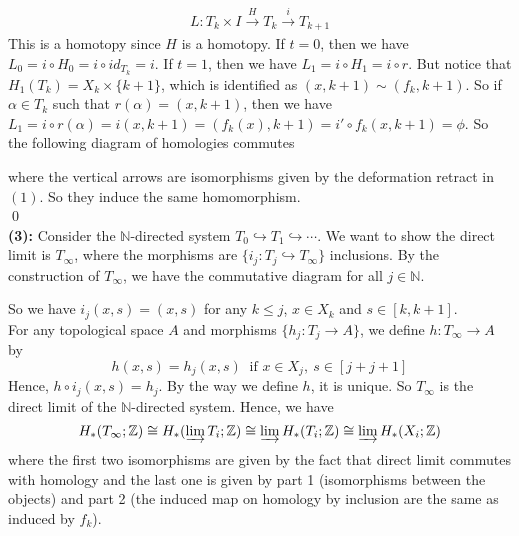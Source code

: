 \documentclass[12pt]{amsart}
\newcommand{\Z}{\mathbb{Z}}
\newcommand{\N}{\mathbb{N}}
\begin{document}
\[L:T_k\times I\xrightarrow[]{H}T_k\xrightarrow[]{i} T_{k+1}\]
This is a homotopy since $H$ is a homotopy. If $t=0$, then we have $L_0=i\circ H_0=i\circ id_{T_k}=i$. If $t=1$, then we have $L_1=i\circ H_1=i\circ r$. But notice that $H_1(T_k)=X_k\times \{k+1\}$, which is identified as $(x,k+1)\sim(f_k,k+1)$. So if $\alpha\in T_k$ such that $r(\alpha)=(x,k+1)$, then we have 
$L_1=i\circ r(\alpha)=i(x,k+1)=(f_k(x),k+1)=i'\circ f_k(x,k+1)=\phi$. So the following diagram of homologies commutes
\begin{center}
\end{center}
where the vertical arrows are isomorphisms given by the deformation retract in $(1)$. So they induce the same homomorphism.
\\\qed\\
\textbf{(3):} Consider the $\N$-directed system $T_0\hookrightarrow T_1\hookrightarrow \cdots $. We want to show the direct limit is $T_\infty$, where the morphisms are $\{i_j:T_j\hookrightarrow T_\infty\}$ inclusions. By the construction of $T_\infty$, we have the commutative diagram for all $j\in\N$.
\begin{center}
\end{center}
So we have $i_j(x,s)=(x,s)$ for any $k\leq j$, $x\in X_k$ and $s\in[k,k+1]$.\\
For any topological space $A$ and morphisms $\{h_j:T_j\to A\}$, we define $h:T_\infty\to A$ by 
\[h(x,s)=h_j(x,s) \ \text{ if }x\in X_j, \ s\in [j+j+1]\]
Hence, $h\circ i_j(x,s)=h_j$. By the way we define $h$, it is unique. So $T_\infty$ is the direct limit of the $\N$-directed system.
Hence, we have 
\[H_\ast(T_\infty;\Z)\cong H_\ast(\varinjlim T_i;\Z)\cong \varinjlim H_\ast(T_i;\Z)\cong \varinjlim H_\ast(X_i;\Z) \]
where the first two isomorphisms are given by the fact that direct limit commutes with homology and the last one is given by part 1 (isomorphisms between the objects) and part 2 (the induced map on homology by inclusion are the same as induced by $f_k$).\\
\end{document}
